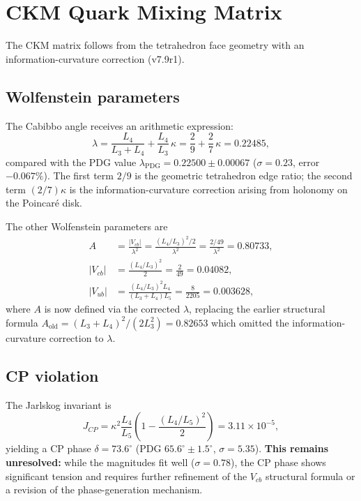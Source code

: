 \documentclass[aps,prd,reprint,twocolumn,showpacs,superscriptaddress]{revtex4-2}
\begin{document}
\section{CKM Quark Mixing Matrix}
\label{sec:ckm}

The CKM matrix follows from the tetrahedron face geometry with an
information-curvature correction (v7.9r1).

\subsection{Wolfenstein parameters}

The Cabibbo angle receives an arithmetic expression:
\begin{equation}
\lambda = \frac{L_4}{L_3 + L_4} + \frac{L_4}{L_3}\,\kappa
       = \frac{2}{9} + \frac{2}{7}\,\kappa
       = 0.22485,
\end{equation}
compared with the PDG value $\lambda_{\text{PDG}} = 0.22500 \pm 0.00067$
($\sigma = 0.23$, error $-0.067\%$).  The first term $2/9$ is the
geometric tetrahedron edge ratio; the second term $(2/7)\kappa$ is
the information-curvature correction arising from holonomy on the
Poincar\'{e} disk.

The other Wolfenstein parameters are
\begin{align}
A &= \frac{|V_{cb}|}{\lambda^2}
   = \frac{(L_4/L_3)^2/2}{\lambda^2}
   = \frac{2/49}{\lambda^2}
   = 0.80733, \\
|V_{cb}| &= \frac{(L_4/L_3)^2}{2} = \frac{2}{49} = 0.04082, \\
|V_{ub}| &= \frac{(L_4/L_3)^2 L_4}{(L_3+L_4)L_5}
         = \frac{8}{2205} = 0.003628,
\end{align}
where $A$ is now defined via the corrected $\lambda$, replacing the
earlier structural formula $A_{\text{old}} = (L_3+L_4)^2/(2 L_3^2) = 0.82653$
which omitted the information-curvature correction to $\lambda$.

\subsection{CP violation}

The Jarlskog invariant is
\begin{equation}
J_{CP} = \kappa^2 \frac{L_4}{L_5}
         \left(1 - \frac{(L_4/L_5)^2}{2}\right)
       = 3.11 \times 10^{-5},
\end{equation}
yielding a CP phase $\delta = 73.6^\circ$ (PDG $65.6^\circ \pm 1.5^\circ$,
$\sigma = 5.35$).  \textbf{This remains unresolved:} while the magnitudes
fit well ($\sigma = 0.78$), the CP phase shows significant tension
and requires further refinement of the $V_{cb}$ structural formula
or a revision of the phase-generation mechanism.
\end{document}
